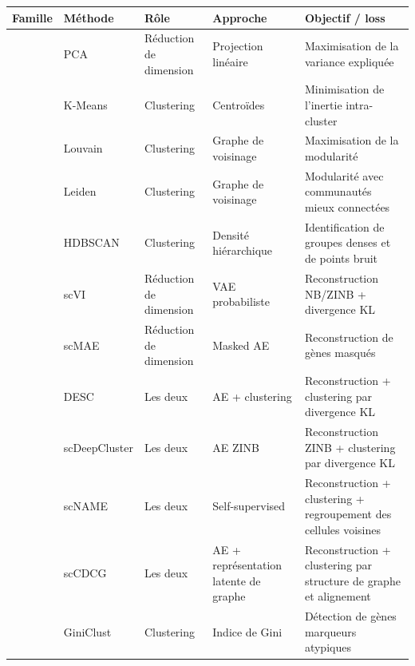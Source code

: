\begin{table}[htbp]
\centering
\setlength{\tabcolsep}{2pt}
\renewcommand{\arraystretch}{1.22}
\begin{tabularx}{\textwidth}{@{}
>{\centering\arraybackslash}p{}
>{\raggedright\arraybackslash}p{}
>{\raggedright\arraybackslash}p{}
>{\raggedright\arraybackslash}p{}
>{\raggedright\arraybackslash}X
@{}}
\toprule
\textbf{Famille} & \textbf{Méthode} & \textbf{Rôle} & \textbf{Approche} & \textbf{Objectif / loss} \\
\midrule
\multirow{5}{0.12\textwidth}{\centering\textbf{Approches classiques}}
& PCA \cite{Pearson1901} & Réduction de dimension & Projection linéaire & Maximisation de la variance expliquée \\
& K-Means \cite{macqueen1967some} & Clustering & Centroïdes & Minimisation de l'inertie intra-cluster \\
& Louvain \cite{blondel2008fast} & Clustering & Graphe de voisinage & Maximisation de la modularité \\
& Leiden \cite{Traag2019Leiden} & Clustering & Graphe de voisinage & Modularité avec communautés mieux connectées \\
& HDBSCAN \cite{Campello2015HDBSCAN} & Clustering & Densité hiérarchique & Identification de groupes denses et de points bruit \\
\midrule
\multirow{6}{0.12\textwidth}{\centering\textbf{Deep Learning}}
& scVI \cite{Lopez2018scVI} & Réduction de dimension & VAE probabiliste & Reconstruction NB/ZINB + divergence KL \\
& scMAE \cite{Fang2024scMAE} & Réduction de dimension & Masked AE & Reconstruction de gènes masqués \\
& DESC \cite{li2020deep} & Les deux & AE + clustering & Reconstruction + clustering par divergence KL \\
& scDeepCluster \cite{tian2019clustering} & Les deux & AE ZINB & Reconstruction ZINB + clustering par divergence KL \\
& scNAME \cite{wan_scname_2022} & Les deux & Self-supervised & Reconstruction + clustering + regroupement des cellules voisines \\
& scCDCG \cite{xu_sccdcg_2025} & Les deux & AE + représentation latente de graphe & Reconstruction + clustering par structure de graphe et alignement \\
\midrule
\multirow{5}{0.12\textwidth}{\centering\textbf{Cellules rares}}
& GiniClust \cite{Jiang2016} & Clustering & Indice de Gini & Détection de gènes marqueurs atypiques \\

\end{tabularx}
\end{table}
